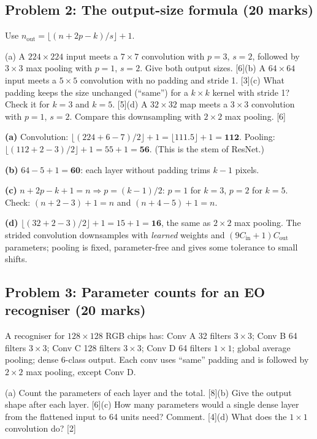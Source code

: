 \documentclass[11pt]{article}
\begin{document}
\subsection{Problem 2: The output-size formula \normalfont\small\color{GreyN}(20 marks)}

\begin{prob}Use $n_{\text{out}}=\lfloor(n+2p-k)/s\rfloor+1$.

(a) A $224\times224$ input meets a $7\times7$ convolution with $p=3$, $s=2$, followed by $3\times3$ max pooling with $p=1$, $s=2$. Give both output sizes. [6]\newline (b) A $64\times64$ input meets a $5\times5$ convolution with no padding and stride 1. [3]\newline (c) What padding keeps the size unchanged (``same'') for a $k\times k$ kernel with stride 1? Check it for $k=3$ and $k=5$. [5]\newline (d) A $32\times32$ map meets a $3\times3$ convolution with $p=1$, $s=2$. Compare this downsampling with $2\times2$ max pooling. [6]\end{prob}

\begin{soln}\textbf{(a)} Convolution: $\lfloor(224+6-7)/2\rfloor+1=\lfloor111.5\rfloor+1=\mathbf{112}$. Pooling: $\lfloor(112+2-3)/2\rfloor+1=55+1=\mathbf{56}$. (This is the stem of ResNet.)

\textbf{(b)} $64-5+1=\mathbf{60}$: each layer without padding trims $k-1$ pixels.

\textbf{(c)} $n+2p-k+1=n\Rightarrow p=(k-1)/2$: $p=1$ for $k=3$, $p=2$ for $k=5$. Check: $(n+2-3)+1=n$ and $(n+4-5)+1=n$.

\textbf{(d)} $\lfloor(32+2-3)/2\rfloor+1=15+1=\mathbf{16}$, the same as $2\times2$ max pooling. The strided convolution downsamples with \textit{learned} weights and $(9C_{\text{in}}+1)C_{\text{out}}$ parameters; pooling is fixed, parameter-free and gives some tolerance to small shifts.\end{soln}

\subsection{Problem 3: Parameter counts for an EO recogniser \normalfont\small\color{GreyN}(20 marks)}

\begin{prob}A recogniser for $128\times128$ RGB chips has: Conv A 32 filters $3\times3$; Conv B 64 filters $3\times3$; Conv C 128 filters $3\times3$; Conv D 64 filters $1\times1$; global average pooling; dense 6-class output. Each conv uses ``same'' padding and is followed by $2\times2$ max pooling, except Conv D.

(a) Count the parameters of each layer and the total. [8]\newline (b) Give the output shape after each layer. [6]\newline (c) How many parameters would a single dense layer from the flattened input to 64 units need? Comment. [4]\newline (d) What does the $1\times1$ convolution do? [2]\end{prob}
\end{document}
